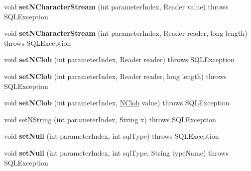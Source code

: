 \begin{DoxyCompactItemize}
void {\bfseries set\+N\+Character\+Stream} (int parameter\+Index, Reader value)  throws S\+Q\+L\+Exception 
\item 
\mbox{\label{classcom_1_1mysql_1_1cj_1_1jdbc_1_1_client_prepared_statement_a1062aa507a182c8345a14ff7e158ce43}} 
void {\bfseries set\+N\+Character\+Stream} (int parameter\+Index, Reader reader, long length)  throws S\+Q\+L\+Exception 
\item 
\mbox{\label{classcom_1_1mysql_1_1cj_1_1jdbc_1_1_client_prepared_statement_a69b12e0f583a8c4cd4c65c936febe686}} 
void {\bfseries set\+N\+Clob} (int parameter\+Index, Reader reader)  throws S\+Q\+L\+Exception 
\item 
\mbox{\label{classcom_1_1mysql_1_1cj_1_1jdbc_1_1_client_prepared_statement_a69736e3c678a7742877b18d1fdeaf7bf}} 
void {\bfseries set\+N\+Clob} (int parameter\+Index, Reader reader, long length)  throws S\+Q\+L\+Exception 
\item 
\mbox{\label{classcom_1_1mysql_1_1cj_1_1jdbc_1_1_client_prepared_statement_aeab9fb7a04ac4d07d81e7c0080815b2a}} 
void {\bfseries set\+N\+Clob} (int parameter\+Index, \mbox{\hyperlink{classcom_1_1mysql_1_1cj_1_1jdbc_1_1_n_clob}{N\+Clob}} value)  throws S\+Q\+L\+Exception 
\item 
void \mbox{\hyperlink{classcom_1_1mysql_1_1cj_1_1jdbc_1_1_client_prepared_statement_a08a3846968d31fb8c91cb4cb384cd545}{set\+N\+String}} (int parameter\+Index, String x)  throws S\+Q\+L\+Exception 
\item 
\mbox{\label{classcom_1_1mysql_1_1cj_1_1jdbc_1_1_client_prepared_statement_a18540732972b9e10e81482f19740512d}} 
void {\bfseries set\+Null} (int parameter\+Index, int sql\+Type)  throws S\+Q\+L\+Exception 
\item 
\mbox{\label{classcom_1_1mysql_1_1cj_1_1jdbc_1_1_client_prepared_statement_a141caf8a4e840c7bc523388c2a14f0cf}} 
void {\bfseries set\+Null} (int parameter\+Index, int sql\+Type, String type\+Name)  throws S\+Q\+L\+Exception 

\end{DoxyCompactItemize}
